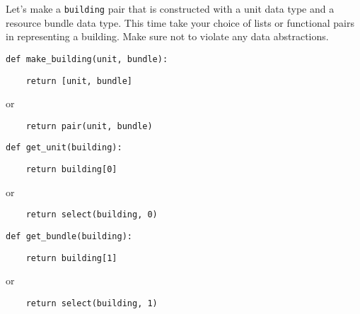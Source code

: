 \question Let's make a {\tt building} pair that is constructed with a unit data
type and a resource bundle data type. This time take your choice of lists or
functional pairs in representing a building. Make sure not to violate any data
abstractions.

\begin{lstlisting}
def make_building(unit, bundle):
\end{lstlisting}
\begin{solution}[0.5in]
\begin{lstlisting}
    return [unit, bundle]
\end{lstlisting}
or
\begin{lstlisting}
    return pair(unit, bundle)
\end{lstlisting}
\end{solution}

\begin{lstlisting}
def get_unit(building):
\end{lstlisting}
\begin{solution}[0.5in]
\begin{lstlisting}
    return building[0]
\end{lstlisting}
or
\begin{lstlisting}
    return select(building, 0)
\end{lstlisting}
\end{solution}

\begin{lstlisting}
def get_bundle(building):
\end{lstlisting}
\begin{solution}[0.5in]
\begin{lstlisting}
    return building[1]
\end{lstlisting}
or
\begin{lstlisting}
    return select(building, 1)
\end{lstlisting}
\end{solution}
